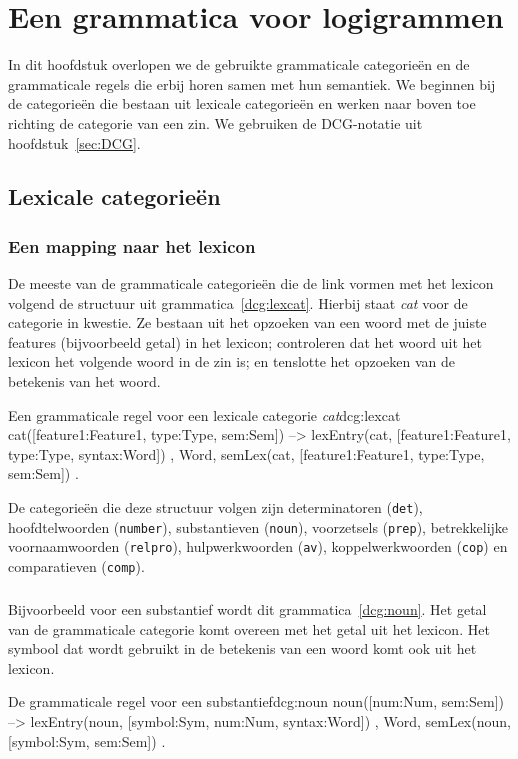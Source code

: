 \chapter{Een grammatica voor logigrammen}

In dit hoofdstuk overlopen we de gebruikte grammaticale categorieën en de grammaticale regels die erbij horen samen met hun semantiek. We beginnen bij de categorieën die bestaan uit lexicale categorieën en werken naar boven toe richting de categorie van een zin. We gebruiken de DCG-notatie uit hoofdstuk~\ref{sec:DCG}.

\section{Lexicale categorieën}
\subsection{Een mapping naar het lexicon}
\label{sec:lexgram}
De meeste van de grammaticale categorieën die de link vormen met het lexicon volgend de structuur uit grammatica~\ref{dcg:lexcat}. Hierbij staat \textit{cat} voor de categorie in kwestie. Ze bestaan uit het opzoeken van een woord met de juiste features (bijvoorbeeld getal) in het lexicon; controleren dat het woord uit het lexicon het volgende woord in de zin is; en tenslotte het opzoeken van de betekenis van het woord.

\begin{dcg}{Een grammaticale regel voor een lexicale categorie \textit{cat}}{dcg:lexcat}
cat([feature1:Feature1, type:Type, sem:Sem]) -->
  { lexEntry(cat, [feature1:Feature1, type:Type, syntax:Word]) },
  Word,
  { semLex(cat, [feature1:Feature1, type:Type, sem:Sem]) }.
\end{dcg}

De categorieën die deze structuur volgen zijn determinatoren (\texttt{det}), hoofdtelwoorden (\texttt{number}), substantieven (\texttt{noun}), voorzetsels (\texttt{prep}), betrekkelijke voornaamwoorden (\texttt{relpro}), hulpwerkwoorden (\texttt{av}), koppelwerkwoorden (\texttt{cop}) en comparatieven (\texttt{comp}).

\paragraph{}Bijvoorbeeld voor een substantief wordt dit grammatica~\ref{dcg:noun}. Het getal van de grammaticale categorie komt overeen met het getal uit het lexicon. Het symbool dat wordt gebruikt in de betekenis van een woord komt ook uit het lexicon.
\begin{dcg}{De grammaticale regel voor een substantief}{dcg:noun}
noun([num:Num, sem:Sem]) -->
  { lexEntry(noun, [symbol:Sym, num:Num, syntax:Word]) },
  Word,
  { semLex(noun, [symbol:Sym, sem:Sem]) }.
\end{dcg}

